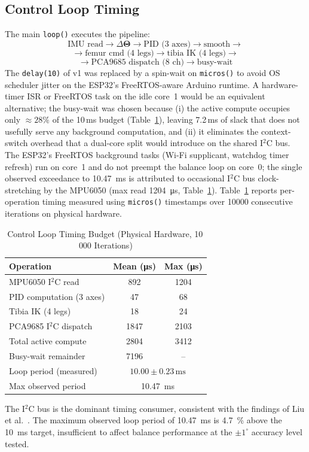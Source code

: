 \documentclass[journal]{IEEEtran}
\newcommand{\vect}[1]{\boldsymbol{#1}}
\newcommand{\dg}{^{\circ}}
\begin{document}
\subsection{Control Loop Timing}
\label{subsec:timing}
The main \texttt{loop()} executes the pipeline:
\[
\text{IMU read} \to \Delta\vect{\Theta} \to
\text{PID (3 axes)} \to \text{smooth} \to \] \[ \to
\text{femur cmd (4 legs)} \to \text{tibia IK (4 legs)} \to \] \[ \to
\text{PCA9685 dispatch (8 ch)} \to \text{busy-wait}
\]
\noindent The \texttt{delay(10)} of v1 was replaced by a
spin-wait on \texttt{micros()} to avoid OS scheduler jitter on
the ESP32's FreeRTOS-aware Arduino runtime.
A hardware-timer ISR or FreeRTOS task on the idle core~1 would
be an equivalent alternative; the busy-wait was chosen because
(i) the active compute occupies only $\approx28\%$ of the
10\,ms budget (Table~\ref{tab:timing}), leaving 7.2\,ms of
slack that does not usefully serve any background computation,
and (ii) it eliminates the context-switch overhead that a
dual-core split would introduce on the shared I$^2$C bus.
The ESP32's FreeRTOS background tasks (Wi-Fi supplicant, watchdog
timer refresh) run on core~1 and do not preempt the balance loop
on core~0; the single observed exceedance to \SI{10.47}{\milli\second}
is attributed to occasional I$^2$C bus clock-stretching by the
MPU6050 (max read \SI{1204}{\micro\second}, Table~\ref{tab:timing}).
Table~\ref{tab:timing} reports per-operation timing measured
using \texttt{micros()} timestamps over \num{10000} consecutive
iterations on physical hardware.
\begin{table}[!t]
\caption{Control Loop Timing Budget (Physical Hardware, 10\,000 Iterations)}
\label{tab:timing}
\centering
\footnotesize
\setlength{\tabcolsep}{5pt}
\begin{tabular}{lcc}
\toprule
\textbf{Operation} & \textbf{Mean (\si{\micro\second})}
                   & \textbf{Max (\si{\micro\second})} \\
\midrule
MPU6050 I$^2$C read       & 892   & 1204  \\
PID computation (3 axes)  &  47   &   68  \\
Tibia IK (4 legs)         &  18   &   24  \\
PCA9685 I$^2$C dispatch   & 1847  & 2103  \\
\midrule
Total active compute      & 2804  & 3412  \\
Busy-wait remainder       & 7196  & --    \\
\midrule
Loop period (measured)    & \multicolumn{2}{c}{$10.00 \pm 0.23\,\text{ms}$} \\
Max observed period       & \multicolumn{2}{c}{\SI{10.47}{\milli\second}} \\
\bottomrule
\end{tabular}
\end{table}
The I$^2$C bus is the dominant timing consumer, consistent
with the findings of Liu et al.\ \cite{liu2024sensing}.
The maximum observed loop period of \SI{10.47}{\milli\second}
is \SI{4.7}{\percent} above the \SI{10}{\milli\second} target,
insufficient to affect balance performance at the
$\pm1\dg$ accuracy level tested.
\end{document}

